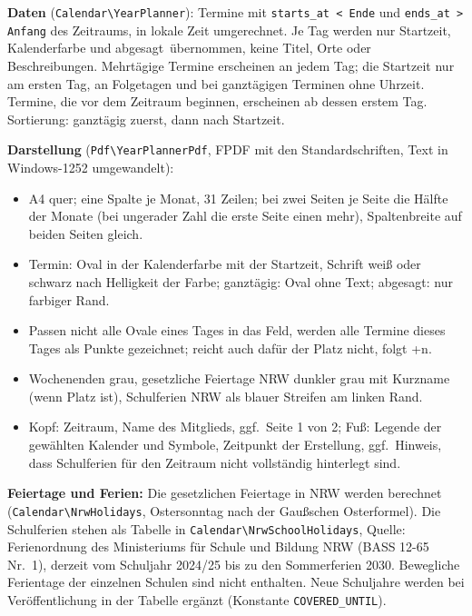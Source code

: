 \documentclass[a4paper,fontsize=10pt]{scrartcl}
\newcommand{\code}[1]{\texttt{#1}}
\begin{document}
\textbf{Daten} (\code{Calendar\textbackslash YearPlanner}): Termine mit
\code{starts\_at < Ende} und \code{ends\_at > Anfang} des Zeitraums, in
lokale Zeit umgerechnet. Je Tag werden nur Startzeit, Kalenderfarbe und
\glqq abgesagt\grqq\ übernommen, keine Titel, Orte oder Beschreibungen.
Mehrtägige Termine erscheinen an jedem Tag; die Startzeit nur am ersten Tag,
an Folgetagen und bei ganztägigen Terminen ohne Uhrzeit. Termine, die vor dem
Zeitraum beginnen, erscheinen ab dessen erstem Tag. Sortierung: ganztägig
zuerst, dann nach Startzeit.

\textbf{Darstellung} (\code{Pdf\textbackslash YearPlannerPdf}, FPDF mit den
Standardschriften, Text in Windows-1252 umgewandelt):

\begin{itemize}
  \item A4 quer; eine Spalte je Monat, 31 Zeilen; bei zwei Seiten je Seite
        die Hälfte der Monate (bei ungerader Zahl die erste Seite einen mehr),
        Spaltenbreite auf beiden Seiten gleich.
  \item Termin: Oval in der Kalenderfarbe mit der Startzeit, Schrift weiß oder
        schwarz nach Helligkeit der Farbe; ganztägig: Oval ohne Text;
        abgesagt: nur farbiger Rand.
  \item Passen nicht alle Ovale eines Tages in das Feld, werden alle Termine
        dieses Tages als Punkte gezeichnet; reicht auch dafür der Platz nicht,
        folgt \glqq +n\grqq.
  \item Wochenenden grau, gesetzliche Feiertage NRW dunkler grau mit
        Kurzname (wenn Platz ist), Schulferien NRW als blauer Streifen am
        linken Rand.
  \item Kopf: Zeitraum, Name des Mitglieds, ggf.\ \glqq Seite 1 von 2\grqq;
        Fuß: Legende der gewählten Kalender und Symbole, Zeitpunkt der
        Erstellung, ggf.\ Hinweis, dass Schulferien für den Zeitraum nicht
        vollständig hinterlegt sind.
\end{itemize}

\textbf{Feiertage und Ferien:} Die gesetzlichen Feiertage in NRW werden
berechnet (\code{Calendar\textbackslash NrwHolidays}, Ostersonntag nach der
Gaußschen Osterformel). Die Schulferien stehen als Tabelle in
\code{Calendar\textbackslash NrwSchoolHolidays}, Quelle: Ferienordnung des
Ministeriums für Schule und Bildung NRW (BASS 12-65 Nr.~1), derzeit vom
Schuljahr 2024/25 bis zu den Sommerferien 2030. Bewegliche Ferientage der
einzelnen Schulen sind nicht enthalten. Neue Schuljahre werden bei
Veröffentlichung in der Tabelle ergänzt (Konstante \code{COVERED\_UNTIL}).
\end{document}

